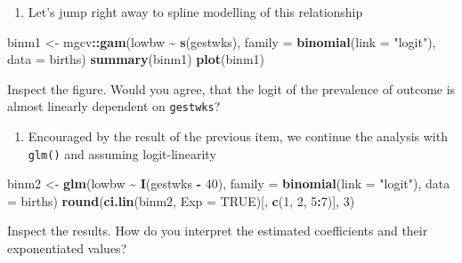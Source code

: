 \documentclass[
]{book}
\newenvironment{Shaded}{\begin{snugshade}}{\end{snugshade}}
\newcommand{\AttributeTok}[1]{\textcolor[rgb]{0.13,0.29,0.53}{#1}}
\newcommand{\ConstantTok}[1]{\textcolor[rgb]{0.56,0.35,0.01}{#1}}
\newcommand{\DecValTok}[1]{\textcolor[rgb]{0.00,0.00,0.81}{#1}}
\newcommand{\FunctionTok}[1]{\textcolor[rgb]{0.13,0.29,0.53}{\textbf{#1}}}
\newcommand{\NormalTok}[1]{#1}
\newcommand{\OtherTok}[1]{\textcolor[rgb]{0.56,0.35,0.01}{#1}}
\newcommand{\SpecialCharTok}[1]{\textcolor[rgb]{0.81,0.36,0.00}{\textbf{#1}}}
\newcommand{\StringTok}[1]{\textcolor[rgb]{0.31,0.60,0.02}{#1}}
\providecommand{\tightlist}{%
  \setlength{\itemsep}{0pt}\setlength{\parskip}{0pt}}
\begin{document}
\begin{enumerate}
\def\labelenumi{\arabic{enumi}.}
\setcounter{enumi}{3}
\tightlist
\item
  Let's jump right away to spline modelling of this relationship
\end{enumerate}

\begin{Shaded}
\begin{Highlighting}[]
\NormalTok{binm1 }\OtherTok{\textless{}{-}}\NormalTok{ mgcv}\SpecialCharTok{::}\FunctionTok{gam}\NormalTok{(lowbw }\SpecialCharTok{\textasciitilde{}} \FunctionTok{s}\NormalTok{(gestwks), }\AttributeTok{family =} \FunctionTok{binomial}\NormalTok{(}\AttributeTok{link =} \StringTok{"logit"}\NormalTok{), }\AttributeTok{data =}\NormalTok{ births)}
\FunctionTok{summary}\NormalTok{(binm1)}
\FunctionTok{plot}\NormalTok{(binm1)}
\end{Highlighting}
\end{Shaded}

Inspect the figure. Would you agree, that the logit of the prevalence
of outcome is almost linearly dependent on \texttt{gestwks}?

\begin{enumerate}
\def\labelenumi{\arabic{enumi}.}
\setcounter{enumi}{4}
\tightlist
\item
  Encouraged by the result of the previous item, we continue the analysis
  with \texttt{glm()} and assuming logit-linearity
\end{enumerate}

\begin{Shaded}
\begin{Highlighting}[]
\NormalTok{binm2 }\OtherTok{\textless{}{-}} \FunctionTok{glm}\NormalTok{(lowbw }\SpecialCharTok{\textasciitilde{}} \FunctionTok{I}\NormalTok{(gestwks }\SpecialCharTok{{-}} \DecValTok{40}\NormalTok{), }\AttributeTok{family =} \FunctionTok{binomial}\NormalTok{(}\AttributeTok{link =} \StringTok{"logit"}\NormalTok{), }\AttributeTok{data =}\NormalTok{ births)}
\FunctionTok{round}\NormalTok{(}\FunctionTok{ci.lin}\NormalTok{(binm2, }\AttributeTok{Exp =} \ConstantTok{TRUE}\NormalTok{)[, }\FunctionTok{c}\NormalTok{(}\DecValTok{1}\NormalTok{, }\DecValTok{2}\NormalTok{, }\DecValTok{5}\SpecialCharTok{:}\DecValTok{7}\NormalTok{)], }\DecValTok{3}\NormalTok{)}
\end{Highlighting}
\end{Shaded}

Inspect the results. How do you interpret the estimated coefficients
and their exponentiated values?
\end{document}
